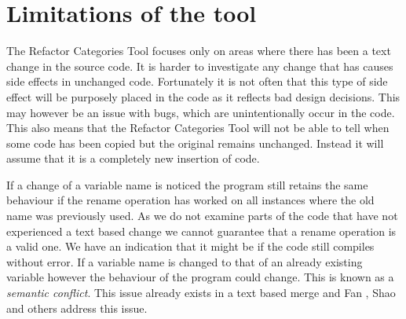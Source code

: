 
\section{Limitations of the tool}
The Refactor Categories Tool focuses only on areas where there has been a text change in the source code. 
It is harder to investigate any change that has causes side effects in unchanged code.  Fortunately it is not often that this type of side effect will be purposely placed in the code as it reflects bad design decisions.  This may however be an issue with bugs, which are unintentionally occur in the code.
This also means that the Refactor Categories Tool will not be able to tell when some code has been copied but the original remains unchanged. Instead it will assume that it is a completely new insertion of code.

If a change of a variable name is noticed the program still retains the same behaviour if the rename operation has worked on all instances where the old name was previously used.  As we do not examine parts of the code that have not experienced a text based change we cannot guarantee that a rename operation is a valid one. We have an indication that it might be if the code still compiles without error. If a variable name is changed to that of an already existing variable however the behaviour of the program could change. This is known as a \emph{semantic conflict}.  This issue already exists in a text based merge and Fan \cite{Fan2012}, Shao \cite{Shao2009} and others address this issue. 
